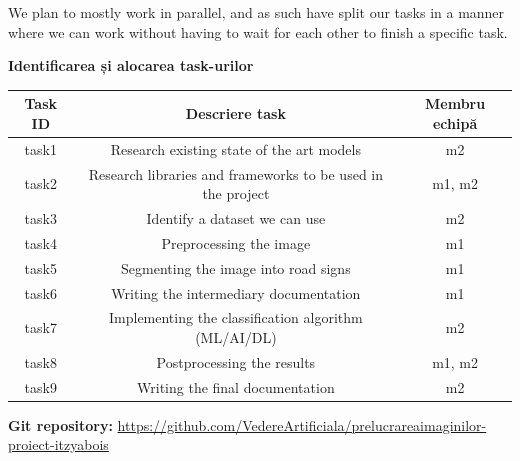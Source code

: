 \documentclass{article}
\begin{document}
We plan to mostly work in parallel, and as such have split our tasks in a manner where we can work without having
to wait for each other to finish a specific task.

\textbf{Identificarea și alocarea task-urilor}

\begin{center}
\begin{tabular}{ |c|c|c| }
 \hline
 \textbf{Task ID} & \textbf{Descriere task} & \textbf{Membru echipă} \\
  \hline
 task1 & Research existing state of the art models & m2 \\ %
  \hline
 task2 & Research libraries and frameworks to be used in the project & m1, m2 \\
 \hline
 task3 & Identify a dataset we can use & m2 \\
 \hline
 task4 & Preprocessing the image & m1 \\
 \hline
 task5 & Segmenting the image into road signs & m1 \\
 \hline
 task6 & Writing the intermediary documentation & m1 \\
 \hline
 task7 & Implementing the classification algorithm (ML/AI/DL) & m2 \\
 \hline
 task8 & Postprocessing the results & m1, m2 \\
 \hline
 task9 & Writing the final documentation & m2 \\
 \hline
\end{tabular}
\end{center}

\textbf{Git repository:} \url{https://github.com/VedereArtificiala/prelucrareaimaginilor-proiect-itzyabois}






\end{document}
